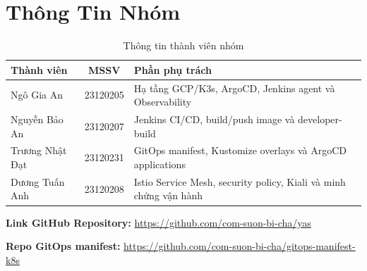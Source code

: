 \section{Thông Tin Nhóm}

\begin{table}[H]
\centering
\caption{Thông tin thành viên nhóm}
\begin{tabular}{|l|c|p{}|}
\hline
\textbf{Thành viên} & \textbf{MSSV} & \textbf{Phần phụ trách} \\
\hline
Ngô Gia An & 23120205 & Hạ tầng GCP/K3s, ArgoCD, Jenkins agent và Observability \\
\hline
Nguyễn Bảo An & 23120207 & Jenkins CI/CD, build/push image và developer-build \\
\hline
Trương Nhật Đạt & 23120231 & GitOps manifest, Kustomize overlays và ArgoCD applications \\
\hline
Dương Tuấn Anh & 23120208 & Istio Service Mesh, security policy, Kiali và minh chứng vận hành \\
\hline
\end{tabular}
\end{table}

\textbf{Link GitHub Repository:} \url{https://github.com/com-suon-bi-cha/yas}

\textbf{Repo GitOps manifest:} \url{https://github.com/com-suon-bi-cha/gitops-manifest-k8s}
